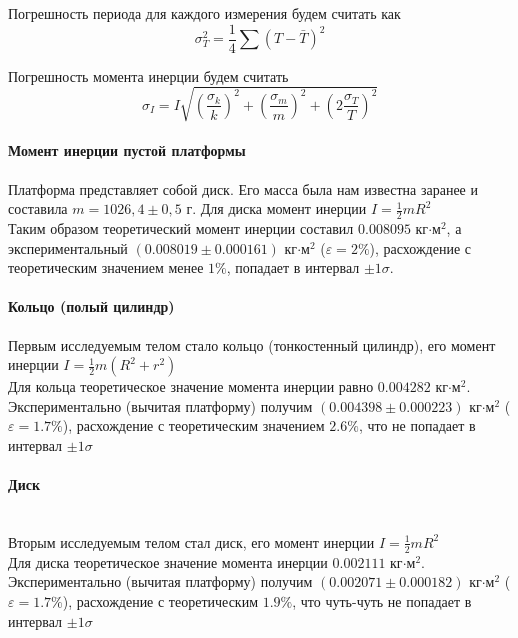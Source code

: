 \documentclass[a4paper,12pt]{article}
\begin{document}
	Погрешность периода для каждого измерения будем считать как
	\begin{equation}
		\sigma_T^2=\frac{1}{4}\sum (T-\bar{T})^2
	\end{equation}
	
	Погрешность момента инерции будем считать
	\begin{equation}
		\sigma_I=I\sqrt{\left(\frac{\sigma_k}{k}\right)^2+\left(\frac{\sigma_m}{m}\right)^2+\left(2\frac{\sigma_T}{T}\right)^2}
	\end{equation}
	
	\paragraph{Момент инерции пустой платформы}
	Платформа представляет собой диск. Его масса была нам известна заранее и составила $m=1026,4\pm 0,5$ г. Для диска момент инерции $I=\frac{1}{2}mR^2$\\
	
	Таким образом теоретический момент инерции составил $0.008095$ кг$\cdot$м$^2$, а экспериментальный $(0.008019\pm 0.000161)$ кг$\cdot$м$^2$ ($\varepsilon=2\%$), расхождение с теоретическим значением менее $1\%$, попадает в интервал $\pm 1\sigma$.\\
	
	\paragraph{Кольцо (полый цилиндр)}
	Первым исследуемым телом стало кольцо (тонкостенный цилиндр), его момент инерции $I=\frac{1}{2}m(R^2+r^2)$\\
	
	Для кольца теоретическое значение момента инерции равно $0.004282$ кг$\cdot$м$^2$. Экспериментально (вычитая платформу) получим $(0.004398\pm0.000223)$ кг$\cdot$м$^2$ ($\varepsilon=1.7\%$), расхождение с теоретическим значением $2.6\%$, что не попадает в интервал $\pm 1 \sigma$\\
	
	\paragraph{Диск}\mbox{}\\
	
	Вторым исследуемым телом стал диск, его момент инерции $I=\frac{1}{2}mR^2$\\
	
	Для диска теоретическое значение момента инерции $0.002111$ кг$\cdot$м$^2$. Экспериментально (вычитая платформу) получим $(0.002071\pm 0.000182)$ кг$\cdot$м$^2$ ($\varepsilon=1.7\%$), расхождение с теоретическим $1.9\%$, что чуть-чуть не попадает в интервал $\pm 1 \sigma$	
	
\end{document}
